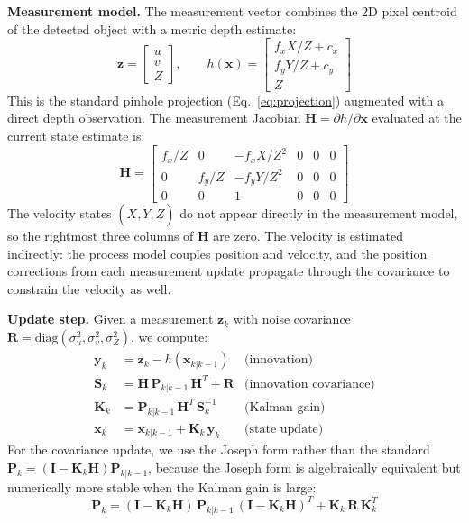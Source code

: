 \documentclass[letterpaper, 10 pt, conference]{ieeeconf}  %
\begin{document}
\textbf{Measurement model.}
The measurement vector combines the 2D pixel centroid of the detected object with a metric depth estimate:
\begin{equation}
\mathbf{z} = \begin{bmatrix} u \\ v \\ Z \end{bmatrix}, \qquad
h(\mathbf{x}) = \begin{bmatrix} f_x X/Z + c_x \\ f_y Y/Z + c_y \\ Z \end{bmatrix}
\end{equation}
This is the standard pinhole projection (Eq.~\ref{eq:projection}) augmented with a direct depth observation. The measurement Jacobian $\mathbf{H} = \partial h / \partial \mathbf{x}$ evaluated at the current state estimate is:
\begin{equation}
\mathbf{H} = \begin{bmatrix}
f_x/Z & 0 & -f_x X/Z^2 & 0 & 0 & 0 \\[3pt]
0 & f_y/Z & -f_y Y/Z^2 & 0 & 0 & 0 \\[3pt]
0 & 0 & 1 & 0 & 0 & 0
\end{bmatrix}
\label{eq:jacobian}
\end{equation}
The velocity states $(\dot{X}, \dot{Y}, \dot{Z})$ do not appear directly in the measurement model, so the rightmost three columns of $\mathbf{H}$ are zero. The velocity is estimated indirectly: the process model couples position and velocity, and the position corrections from each measurement update propagate through the covariance to constrain the velocity as well.

\textbf{Update step.}
Given a measurement $\mathbf{z}_k$ with noise covariance $\mathbf{R} = \text{diag}(\sigma_u^2, \sigma_v^2, \sigma_Z^2)$, we compute:
\begin{align}
\mathbf{y}_k &= \mathbf{z}_k - h(\mathbf{x}_{k|k-1}) & \text{(innovation)} \label{eq:innovation} \\
\mathbf{S}_k &= \mathbf{H} \, \mathbf{P}_{k|k-1} \, \mathbf{H}^T + \mathbf{R} & \text{(innovation covariance)} \\
\mathbf{K}_k &= \mathbf{P}_{k|k-1} \, \mathbf{H}^T \, \mathbf{S}_k^{-1} & \text{(Kalman gain)} \\
\mathbf{x}_k &= \mathbf{x}_{k|k-1} + \mathbf{K}_k \, \mathbf{y}_k & \text{(state update)}
\end{align}
For the covariance update, we use the Joseph form rather than the standard $\mathbf{P}_k = (\mathbf{I} - \mathbf{K}_k \mathbf{H}) \mathbf{P}_{k|k-1}$, because the Joseph form is algebraically equivalent but numerically more stable when the Kalman gain is large:
\begin{equation}
\mathbf{P}_k = (\mathbf{I} - \mathbf{K}_k \mathbf{H}) \, \mathbf{P}_{k|k-1} \, (\mathbf{I} - \mathbf{K}_k \mathbf{H})^T + \mathbf{K}_k \, \mathbf{R} \, \mathbf{K}_k^T
\label{eq:joseph}
\end{equation}
\end{document}
